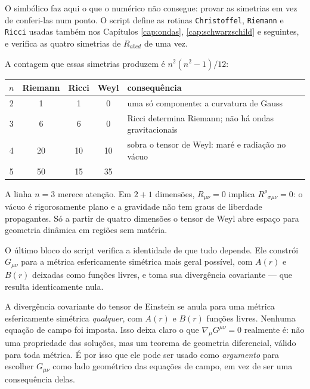 
O simbólico faz aqui o que o numérico não consegue: provar as simetrias em
vez de conferi-las num ponto. O script define as rotinas
\texttt{Christoffel}, \texttt{Riemann} e \texttt{Ricci} usadas também nos
Capítulos \ref{cap:ondas}, \ref{cap:schwarzschild} e seguintes, e verifica as
quatro simetrias de $R_{abcd}$ de uma vez.

A contagem que essas simetrias produzem é $n^2(n^2-1)/12$:

\begin{center}
\small
\begin{tabular}{ccccp{5.4cm}}
\toprule
$n$ & Riemann & Ricci & Weyl & consequência \\
\midrule
2 & 1 & 1 & 0 & uma só componente: a curvatura de Gauss \\
3 & 6 & 6 & 0 & Ricci determina Riemann; não há ondas gravitacionais \\
4 & 20 & 10 & 10 & sobra o tensor de Weyl: maré e radiação no vácuo \\
5 & 50 & 15 & 35 & \\
\bottomrule
\end{tabular}
\end{center}

A linha $n=3$ merece atenção. Em $2+1$ dimensões, $R_{\mu\nu}=0$ implica
$R^\rho{}_{\sigma\mu\nu}=0$: o vácuo é rigorosamente plano e a gravidade não
tem graus de liberdade propagantes. Só a partir de quatro dimensões o tensor
de Weyl abre espaço para geometria dinâmica em regiões sem matéria.

O último bloco do script verifica a identidade de que tudo depende. Ele
constrói $G_{\mu\nu}$ para a métrica esfericamente simétrica mais geral
possível, com $A(r)$ e $B(r)$ deixadas como funções livres, e toma sua
divergência covariante --- que resulta identicamente nula.

\begin{central}
A divergência covariante do tensor de Einstein se anula para uma métrica
esfericamente simétrica \emph{qualquer}, com $A(r)$ e $B(r)$ funções livres.
Nenhuma equação de campo foi imposta. Isso deixa claro o que
$\nabla_\mu G^{\mu\nu}=0$ realmente é: não uma propriedade das soluções, mas
um teorema de geometria diferencial, válido para toda métrica. É por isso que
ele pode ser usado como \emph{argumento} para escolher $G_{\mu\nu}$ como lado
geométrico das equações de campo, em vez de ser uma consequência delas.
\end{central}

